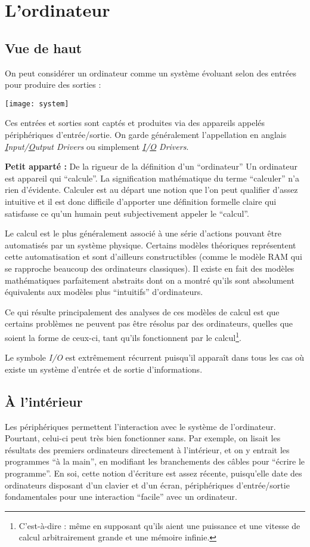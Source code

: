 \documentclass[../../main.tex]{subfiles}
\begin{document}
\section{L'ordinateur}
\label{sec:l_ordinateur}
\subsection{Vue de haut} \label{sub:vue_de_haut}
On peut considérer un ordinateur comme un système évoluant selon des entrées pour produire des sorties :
\begin{center}
  \texttt{[image: system]}
\end{center}
Ces entrées et sorties sont captés et produites via des appareils appelés périphériques d'entrée/sortie. On garde généralement l'appellation en anglais \textit{\underline{I}nput/\underline{O}utput Drivers} ou simplement \textit{\underline{I}/\underline{O} Drivers}.

\begin{minitelbasicbox}{\textbf{Petit apparté :} De la rigueur de la définition d'un ``ordinateur''}
Un ordinateur est appareil qui ``calcule''. La signification mathématique du terme ``calculer'' n'a
rien d'évidente. Calculer est au départ une notion que l'on peut qualifier d'assez intuitive et il
est donc difficile d'apporter une définition formelle claire qui satisfasse ce qu'un humain peut
subjectivement appeler le ``calcul''.

Le calcul est le plus généralement associé à une série d'actions pouvant être automatisés par un système physique. Certains modèles théoriques représentent cette automatisation et sont d'ailleurs constructibles (comme le modèle RAM qui se rapproche beaucoup des ordinateurs classiques). Il existe en fait des modèles mathématiques parfaitement abstraits dont on a montré qu'ils sont absolument équivalents aux modèles plus ``intuitifs'' d'ordinateurs.

Ce qui résulte principalement des analyses de ces modèles de calcul est que certains problèmes ne peuvent pas être résolus par des ordinateurs, quelles que soient la forme de ceux-ci, tant qu'ils fonctionnent par le calcul\footnote{C'est-à-dire : même en supposant qu'ils aient une puissance et une vitesse de calcul arbitrairement grande et une mémoire infinie.}.
\end{minitelbasicbox}
Le symbole \textit{I/O} est extrêmement récurrent puisqu'il apparaît dans tous les cas où existe un système d'entrée et de sortie d'informations.
\subsection{À l'intérieur}
\label{sub:_l_int_rieur}
Les périphériques permettent l'interaction avec le système de l'ordinateur. Pourtant, celui-ci peut très bien fonctionner sans. Par exemple, on lisait les résultats des premiers ordinateurs directement à l'intérieur, et on y entrait les programmes ``à la main'', en modifiant les branchements des câbles pour ``écrire le programme''. En soi, cette notion d'écriture est assez récente, puisqu'elle date des ordinateurs disposant d'un clavier et d'un écran, périphériques d'entrée/sortie fondamentales pour une interaction ``facile'' avec un ordinateur.
\end{document}
